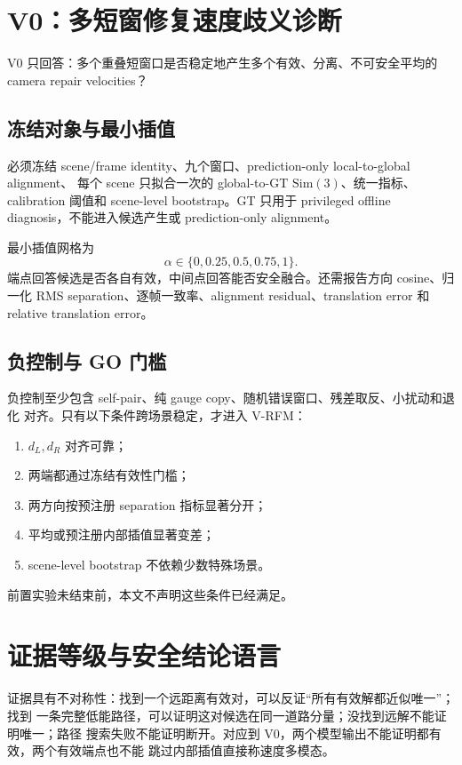 \documentclass[UTF8,a4paper,11pt]{ctexart}
\newcommand{\Sim}{\mathrm{Sim}}
\begin{document}
\section{V0：多短窗修复速度歧义诊断}

V0 只回答：多个重叠短窗口是否稳定地产生多个有效、分离、不可安全平均的 camera
repair velocities？

\subsection{冻结对象与最小插值}

必须冻结 scene/frame identity、九个窗口、prediction-only local-to-global alignment、
每个 scene 只拟合一次的 global-to-GT $\Sim(3)$、统一指标、calibration 阈值和
scene-level bootstrap。GT 只用于 privileged offline diagnosis，不能进入候选产生或
prediction-only alignment。

最小插值网格为
\begin{equation}
  \alpha\in\{0,0.25,0.5,0.75,1\}.
\end{equation}
端点回答候选是否各自有效，中间点回答能否安全融合。还需报告方向 cosine、归一化
RMS separation、逐帧一致率、alignment residual、translation error 和 relative
translation error。

\subsection{负控制与 GO 门槛}

负控制至少包含 self-pair、纯 gauge copy、随机错误窗口、残差取反、小扰动和退化
对齐。只有以下条件跨场景稳定，才进入 V-RFM：
\begin{enumerate}
  \item $d_L,d_R$ 对齐可靠；
  \item 两端都通过冻结有效性门槛；
  \item 两方向按预注册 separation 指标显著分开；
  \item 平均或预注册内部插值显著变差；
  \item scene-level bootstrap 不依赖少数特殊场景。
\end{enumerate}
前置实验未结束前，本文不声明这些条件已经满足。

\section{证据等级与安全结论语言}

证据具有不对称性：找到一个远距离有效对，可以反证“所有有效解都近似唯一”；找到
一条完整低能路径，可以证明这对候选在同一道路分量；没找到远解不能证明唯一；路径
搜索失败不能证明断开。对应到 V0，两个模型输出不能证明都有效，两个有效端点也不能
跳过内部插值直接称速度多模态。
\end{document}
